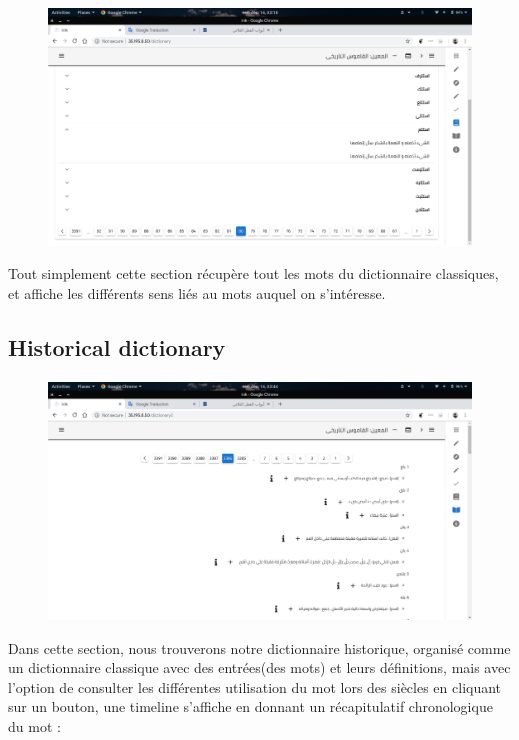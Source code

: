\documentclass[]{report}
\begin{document}
			\paragraph{}
			\begin{figure}[H]
				\centering
				\includegraphics[width=0.8\linewidth]{images/app/allwords.png}
			\end{figure}
			Tout simplement cette section récupère tout les mots du dictionnaire classiques, et affiche les différents sens liés
			au mots auquel on s'intéresse.
			
		\subsection{Historical dictionary}
			\paragraph{}
			\begin{figure}[H]
				\centering
				\includegraphics[width=0.8\linewidth]{images/app/histdico.png}
			\end{figure}
			Dans cette section, nous trouverons notre dictionnaire historique, organisé comme un dictionnaire classique avec des entrées(des mots) et leurs définitions, mais avec l'option de consulter les différentes utilisation du mot lors des siècles en cliquant sur un bouton, une timeline s'affiche en donnant un récapitulatif chronologique du mot : 
			
\end{document}
